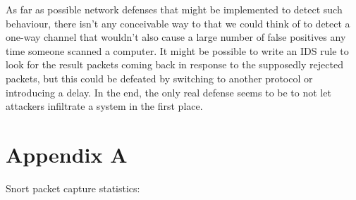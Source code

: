 \documentclass[titlepage]{article}
\begin{document}
As far as possible network defenses that might be implemented to
detect such behaviour, there isn't any conceivable way to that we
could think of to detect a one-way channel that wouldn't also cause
a large number of false positives any time someone scanned a
computer. It might be possible to write an IDS rule to look for
the result packets coming back in response to the supposedly
rejected packets, but this could be defeated by switching to
another protocol or introducing a delay. In the end, the only real
defense seems to be to not let attackers infiltrate a system in the
first place.

\clearpage

\section{Appendix A}
Snort packet capture statistics:
\end{document}
